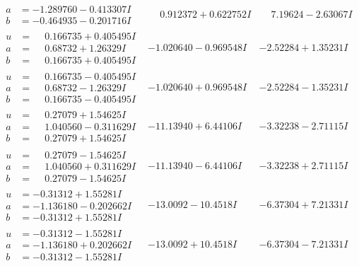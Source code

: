 \documentclass[1p]{elsarticle_modified}
\theoremstyle{definition}
\begin{document}
$$\begin{array}{c|c|c}
\begin{aligned}
a &= -1.289760 - 0.413307 I \\
b &= -0.464935 - 0.201716 I\end{aligned}
 & \phantom{-}0.912372 + 0.622752 I & \phantom{-}7.19624 - 2.63067 I \\ \hline\begin{aligned}
u &= \phantom{-}0.166735 + 0.405495 I \\
a &= \phantom{-}0.68732 + 1.26329 I \\
b &= \phantom{-}0.166735 + 0.405495 I\end{aligned}
 & -1.020640 - 0.969548 I & -2.52284 + 1.35231 I \\ \hline\begin{aligned}
u &= \phantom{-}0.166735 - 0.405495 I \\
a &= \phantom{-}0.68732 - 1.26329 I \\
b &= \phantom{-}0.166735 - 0.405495 I\end{aligned}
 & -1.020640 + 0.969548 I & -2.52284 - 1.35231 I \\ \hline\begin{aligned}
u &= \phantom{-}0.27079 + 1.54625 I \\
a &= \phantom{-}1.040560 - 0.311629 I \\
b &= \phantom{-}0.27079 + 1.54625 I\end{aligned}
 & -11.13940 + 6.44106 I & -3.32238 - 2.71115 I \\ \hline\begin{aligned}
u &= \phantom{-}0.27079 - 1.54625 I \\
a &= \phantom{-}1.040560 + 0.311629 I \\
b &= \phantom{-}0.27079 - 1.54625 I\end{aligned}
 & -11.13940 - 6.44106 I & -3.32238 + 2.71115 I \\ \hline\begin{aligned}
u &= -0.31312 + 1.55281 I \\
a &= -1.136180 - 0.202662 I \\
b &= -0.31312 + 1.55281 I\end{aligned}
 & -13.0092 - 10.4518 I & -6.37304 + 7.21331 I \\ \hline\begin{aligned}
u &= -0.31312 - 1.55281 I \\
a &= -1.136180 + 0.202662 I \\
b &= -0.31312 - 1.55281 I\end{aligned}
 & -13.0092 + 10.4518 I & -6.37304 - 7.21331 I \\ \hline\begin{aligned}

\end{aligned}
\end{array}$$
\end{document}
